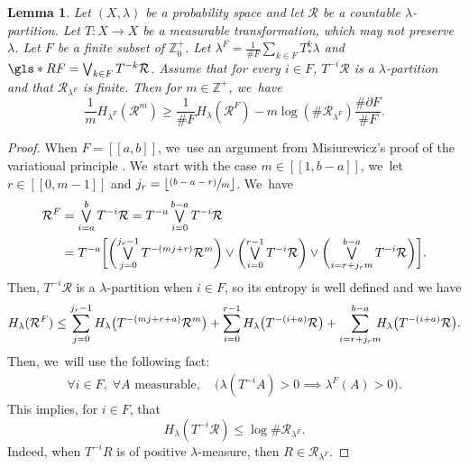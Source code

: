 \documentclass[10pt]{amsart}
\let\oldbigvee\bigvee
\renewcommand{\bigvee}{\mathop{\textstyle\oldbigvee}\displaylimits}
\newcommand{\psfrac}[2]{\sfrac{(#1)}{#2}}
\newtheorem{lem}[thm]{Lemma}
\theoremstyle{definition}
\newcommand{\bbZ}{{\mathbb{Z}}}
\begin{document}
\begin{lem}
\label{lem:Misiurewicz}
Let $(X, \lambda)$ be a probability space and let $\mathcal{R}$ be a countable $\lambda$-partition. Let $T : X \to X$ be a measurable transformation, which may not preserve $\lambda$. Let $F$ be a finite subset of $\bbZ_0^+$.
Let $\lambda^F = \frac{1}{\# F} \sum_{k \in F} T^k_* \lambda$ and $\gls*{RF} = \bigvee_{k \in F} T^{-k} \mathcal{R}$.
Assume that for every $i \in F$, $T^{-i} \mathcal{R}$ is a $\lambda$-partition and that $\mathcal{R}_{\lambda^F}$ is finite.
Then for $m \in \bbZ^+$, we~have
\[
\frac{1}{m} H_{\lambda^F} (\mathcal{R}^m) \geq \frac{1}{\# F} H_{\lambda}(\mathcal{R}^F) - m \log (\# \mathcal{R}_{\lambda^F}) \frac{\# \partial F}{\# F}.
\]
\end{lem}
\begin{proof}
When $F = [\![ a, b ]\!]$, we~use an argument from Misiurewicz's proof of the variational principle \cite{Misiurewicz1976}. We~start with the case $m \in [\![ 1, b-a ]\!]$, we~let $r \in [\![ 0, m-1 ]\!]$ and $j_r = \lfloor \psfrac{b-a - r}{m} \rfloor$. We~have
\begin{align*}
\mathcal{R}^F &= \bigvee_{i=a}^b T^{-i} \mathcal{R}
= T^{-a} \bigvee_{i=0}^{b-a} T^{-i} \mathcal{R}\\
&=T^{-a} \biggl [ \biggl (\bigvee_{j=0}^{j_r - 1} T^{-(mj + r)} \mathcal{R}^m \biggr)
\vee \biggl (\bigvee_{i=0}^{r-1} T^{-i} \mathcal{R} \biggr)
\vee \biggl (\bigvee_{i=r+j_r m}^{b-a} T^{-i} \mathcal{R} \biggr) \biggr ].
\end{align*}
Then, $T^{-i} \mathcal{R}$ is a $\lambda$-partition when $i \in F$, so its entropy is well defined and we have
\begin{align*}
H_{\lambda}(\mathcal{R}^F)
\leq \sum_{j=0}^{j_r - 1} H_{\lambda} \bigl (T^{-(mj + r+a)} \mathcal{R}^m \bigr)
+ \sum_{i=0}^{r-1} H_{\lambda} \bigl (T^{-(i+a)} \mathcal{R} \bigr)
+ \sum_{i=r+j_r m}^{b-a}\hspace*{-2mm} H_{\lambda} \bigl (T^{-(i+a)} \mathcal{R} \bigr).
\end{align*}
Then, we~will use the following fact:\enlargethispage{-2\baselineskip}
\begin{align}
\forall i \in F,\; \forall A \text{ measurable},\quad \bigl (\lambda(T^{-i} A) > 0 \implies \lambda^F(A) > 0 \bigr).
\tag{$**$}
\label{link-emp-meas}
\end{align}
This implies, for $i \in F$, that
\[
H_{\lambda}(T^{-i} \mathcal{R}) \leq \log \# \mathcal{R}_{\lambda^F}.
\]
Indeed, when $T^{-i} R$ is of positive $\lambda$-measure, then $R \in \mathcal{R}_{\lambda^F}$.

\end{proof}
\end{document}
